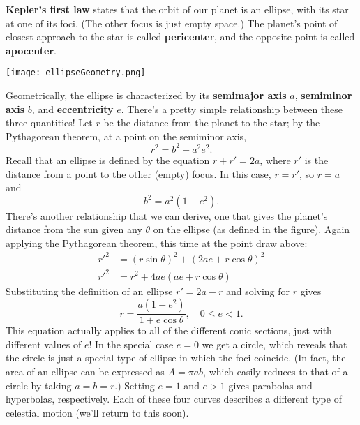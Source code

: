 \documentclass[../a062main.tex]{subfiles}
\begin{document}
\textbf{Kepler's first law} states that the orbit of our planet is an ellipse, with its star at one of its foci.
(The other focus is just empty space.)
The planet's point of closest approach to the star is called \textbf{pericenter}, and the opposite point is called \textbf{apocenter}.
\begin{center}
    \texttt{[image: ellipseGeometry.png]}
\end{center}
Geometrically, the ellipse is characterized by its \textbf{semimajor axis} $a$, \textbf{semiminor axis} $b$, and \textbf{eccentricity} $e$.
There's a pretty simple relationship between these three quantities!
Let $r$ be the distance from the planet to the star; by the Pythagorean theorem, at a point on the semiminor axis,
\[ r^2 = b^2 + a^2e^2. \]
Recall that an ellipse is defined by the equation $r + r' = 2a$, where $r'$ is the distance from a point to the other (empty) focus.
In this case, $r = r'$, so $r = a$ and
\[ \boxed{b^2 = a^2 (1 - e^2)}. \]
There's another relationship that we can derive, one that gives the planet's distance from the sun given any $\theta$ on the ellipse (as defined in the figure).
Again applying the Pythagorean theorem, this time at the point draw above:
\begin{align*}
    r'^2 &= (r \sin \theta)^2 + (2ae + r \cos \theta)^2 \\
    r'^2 &= r^2 + 4ae(ae + r \cos \theta)
\end{align*}
Substituting the definition of an ellipse $r' = 2a - r$ and solving for $r$ gives
\[ \boxed{r = \frac{a(1 - e^2)}{1 + e \cos \theta}, \quad 0 \leq e < 1}. \]
This equation actually applies to all of the different conic sections, just with different values of $e$!
In the special case $e = 0$ we get a circle, which reveals that the circle is just a special type of ellipse in which the foci coincide.
(In fact, the area of an ellipse can be expressed as $A = \pi ab$, which easily reduces to that of a circle by taking $a = b = r$.)
Setting $e=1$ and $e > 1$ gives parabolas and hyperbolas, respectively.
Each of these four curves describes a different type of celestial motion (we'll return to this soon).
\end{document}
